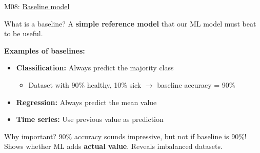 \documentclass[aspectratio=169, 10pt]{beamer}
\begin{document}
\begin{frame}{M08: \href{https://en.wikipedia.org/wiki/Baseline_(machine_learning)}{Baseline model}}

    \begin{block}{\footnotesize What is a baseline?}
        \footnotesize A \textbf{simple reference model} that our ML model must beat to be useful.
    \end{block}

    \vspace{2mm}
    \textbf{Examples of baselines:}

    \begin{itemize}
        \item \textbf{Classification:} Always predict the majority class
        \begin{itemize}
            \item Dataset with 90\% healthy, 10\% sick $\rightarrow$ baseline accuracy = 90\%
        \end{itemize}
        \item \textbf{Regression:} Always predict the mean value
        \item \textbf{Time series:} Use previous value as prediction
    \end{itemize}

    \vspace{2mm}
    \begin{alertblock}{\footnotesize Why important?}
        \footnotesize
        90\% accuracy sounds impressive, but not if baseline is 90\%! Shows whether ML adds \textbf{actual value}. Reveals imbalanced datasets.
    \end{alertblock}

\end{frame}
\end{document}
